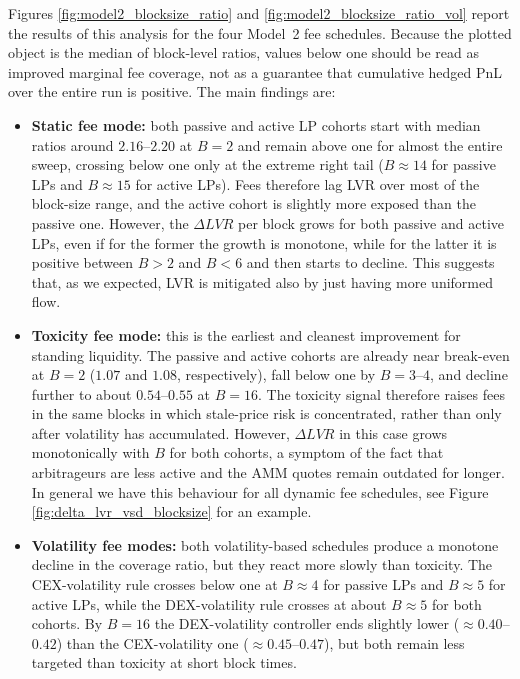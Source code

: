 \documentclass[11pt]{article}
\begin{document}
Figures \ref{fig:model2_blocksize_ratio} and \ref{fig:model2_blocksize_ratio_vol} report the results of this analysis for the four Model~2 fee schedules. Because the
plotted object is the median of block-level ratios, values below one should be read as improved marginal fee coverage,
not as a guarantee that cumulative hedged PnL over the entire run is positive. The main findings are:
\begin{itemize}
  \item \textbf{Static fee mode:} both passive and active LP cohorts start with median ratios around $2.16$--$2.20$ at 
  $B=2$ and remain above one for almost the entire sweep, crossing below one only at the extreme right tail 
  ($B\approx 14$ for passive LPs and $B\approx 15$ for active LPs). Fees therefore lag LVR over most of the block-size 
  range, and the active cohort is slightly more exposed than the passive one. However, the $\Delta LVR$ per block grows
  for both passive and active LPs, even if for the former the growth is monotone, while for the latter it is positive 
  between $B>2$ and $B<6$ and then starts to decline. This suggests that, as we expected, LVR is mitigated also by just
  having more uniformed flow.
  \item \textbf{Toxicity fee mode:} this is the earliest and cleanest improvement for standing liquidity. The passive 
  and active cohorts are already near break-even at $B=2$ ($1.07$ and $1.08$, respectively), fall below one by 
  $B=3$--$4$, and decline further to about $0.54$--$0.55$ at $B=16$. The toxicity signal therefore raises fees in 
  the same blocks in which stale-price risk is concentrated, rather than only after volatility has accumulated. However,
  $\Delta LVR$ in this case grows monotonically with $B$ for both cohorts, a symptom of the fact that arbitrageurs are less
  active and the AMM quotes remain outdated for longer. In general we have this behaviour for all dynamic fee schedules,
  see Figure \ref{fig:delta_lvr_vsd_blocksize} for an example.
  \item \textbf{Volatility fee modes:} both volatility-based schedules produce a monotone decline in the coverage ratio, 
  but they react more slowly than toxicity. The CEX-volatility rule crosses below one at $B\approx 4$ for passive LPs 
  and $B\approx 5$ for active LPs, while the DEX-volatility rule crosses at about $B\approx 5$ for both cohorts. By 
  $B=16$ the DEX-volatility controller ends slightly lower ($\approx 0.40$--$0.42$) than the CEX-volatility one 
  ($\approx 0.45$--$0.47$), but both remain less targeted than toxicity at short block times.

\end{itemize}
\end{document}
